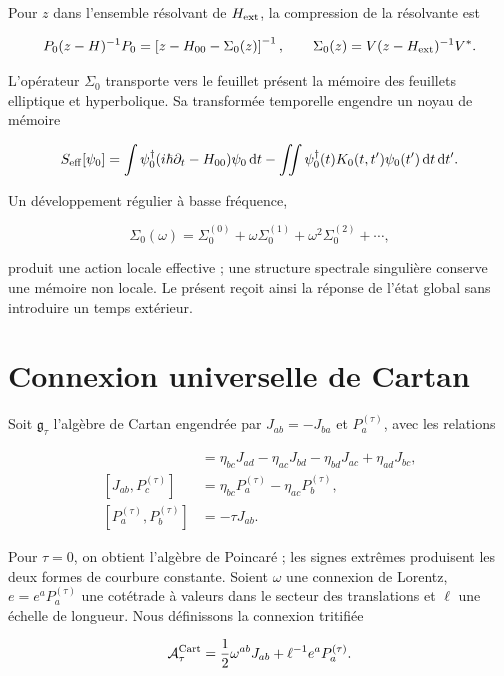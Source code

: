 Pour \(z\) dans l'ensemble résolvant de \(H_{\rm ext}\), la compression de la
résolvante est

\begin{equation}
P_0(z-H)^{-1}P_0
=\left[z-H_{00}-\Sigma_0(z)\right]^{-1},
\qquad
\Sigma_0(z)=V(z-H_{\rm ext})^{-1}V^*.
\label{eq:rm-feshbach-schur}
\end{equation}

L'opérateur \(\Sigma_0\) transporte vers le feuillet présent la mémoire des feuillets
elliptique et hyperbolique. Sa transformée temporelle engendre un noyau de
mémoire

\[
S_{\rm eff}[\psi_0]
=\int\psi_0^\dagger(i\hbar\partial_t-H_{00})\psi_0\,\mathrm dt
-\iint\psi_0^\dagger(t)K_0(t,t')\psi_0(t')\,\mathrm dt\,\mathrm dt'.
\]

Un développement régulier à basse fréquence,

\[
\Sigma_0(\omega)
=\Sigma_0^{(0)}+\omega\Sigma_0^{(1)}
+\omega^2\Sigma_0^{(2)}+\cdots,
\]

produit une action locale effective ; une structure spectrale singulière conserve
une mémoire non locale. Le présent reçoit ainsi la réponse de l'état global sans
introduire un temps extérieur.

\section{Connexion universelle de Cartan}

Soit \(\mathfrak g_\tau\) l'algèbre de Cartan engendrée par
\(J_{ab}=-J_{ba}\) et \(P_a^{(\tau)}\), avec les relations

\begin{align}
 [J_{ab},J_{cd}]&=
 \eta_{bc}J_{ad}-\eta_{ac}J_{bd}
 -\eta_{bd}J_{ac}+\eta_{ad}J_{bc},\\
 [J_{ab},P_c^{(\tau)}]&=
 \eta_{bc}P_a^{(\tau)}-\eta_{ac}P_b^{(\tau)},\\
 [P_a^{(\tau)},P_b^{(\tau)}]&=-\tau J_{ab}.
 \label{eq:rm-cartan-brackets}
\end{align}

Pour \(\tau=0\), on obtient l'algèbre de Poincaré ; les signes extrêmes
produisent les deux formes de courbure constante. Soient \(\omega\) une connexion
de Lorentz, \(e=e^aP_a^{(\tau)}\) une cotétrade à valeurs dans le secteur des
translations et \(\ell\) une échelle de longueur. Nous définissons la connexion
tritifiée

\begin{equation}
\mathcal A_\tau^{\rm Cart}
=\frac12\omega^{ab}J_{ab}+\ell^{-1}e^aP_a^{(\tau)}.
\label{eq:rm-trit-cartan-connection}
\end{equation}

